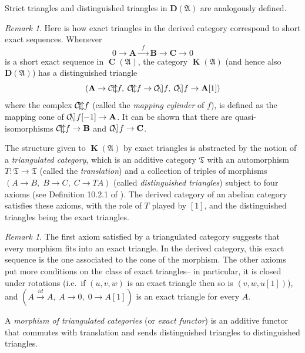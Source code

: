 \documentclass[a4paper]{article}
\theoremstyle{definition}
\theoremstyle{remark}
\newtheorem{remark}[defn]{Remark}
\DeclareMathOperator{\cone}{\mathcal{C\kern -2pt o \kern -2pt n \kern -2pt e
\kern -2pt}}
\DeclareMathOperator{\cyl}{\mathcal{C\kern -2pt y \kern -2pt l\kern -2pt}}
\DeclareMathOperator{\Ch}{\mathbf{C}}
\DeclareMathOperator{\kom}{{\mathbf{K}}}
\newcommand{\deri}{\mathbf{D}}
\begin{document}
Strict triangles and distinguished triangles in \(\deri(\mathfrak{A})\) are
analogously defined. 

\begin{remark}
    Here is how exact triangles in the derived category correspond to short
    exact sequences. Whenever \[0\rightarrow\mathbf{A}\xrightarrow{\;\;f\;\;}
    \mathbf{B} \longrightarrow\mathbf{C} \rightarrow 0\] is a short exact
    sequence in \(\Ch(\mathfrak{A})\), the category \(\kom(\mathfrak{A})\) (and
    hence also \(\deri(\mathfrak{A})\)) has a distinguished triangle 
    \[(\mathbf{A}\rightarrow \cyl f, \; \cyl f \rightarrow \cone f, \; \cone f
    \rightarrow \mathbf{A}[1])\] where the complex \(\cyl f\) (called the
    \textit{mapping cylinder} of \(f\)), is defined as the mapping cone of
    \(\cone f [-1]\rightarrow \mathbf{A}\). It can be shown that there are
    quasi-isomorphisms \(\cyl f \rightarrow \mathbf{B}\) and \(\cone f
    \rightarrow \mathbf{C}\).
\end{remark}

The structure given to \(\kom(\mathfrak{A})\) by exact triangles is abstracted
by the notion of a \textit{triangulated category}, which is an additive category
\(\mathfrak{T}\) with an automorphism \(T:\mathfrak{T}\rightarrow \mathfrak{T}\)
(called the \textit{translation}) and a collection of triples of
morphisms \((A\rightarrow B,\; B\rightarrow C,\; C\rightarrow TA)\) (called
\textit{distinguished triangles}) subject to four axioms (see Definition 10.2.1
of ). The derived category of an abelian
category satisfies these axioms, with the role of \(T\) played by \([1]\), and
the distinguished triangles being the exact triangles. 

\begin{remark}
    The first axiom satisfied by a triangulated category suggests that every
    morphism fits into an exact triangle. In the derived category, this
    exact sequence is the one associated to the cone of the morphism. The other
    axioms put more conditions on the class of exact triangles-- in particular,
    it is closed under rotations (i.e.\ if \((u,v,w)\) is an exact triangle then
    so is \((v,w,u[1])\)), and \((A\xrightarrow{id}A,\; A\rightarrow
    0,\;0\rightarrow A[1])\) is an exact triangle for every \(A\).
\end{remark}

A \textit{morphism of triangulated categories} (or \textit{exact functor}) is an
additive functor that commutes with translation and sends distinguished
triangles to distinguished triangles. 
\end{document}
